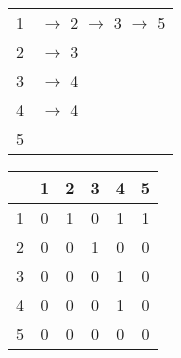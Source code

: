 \documentclass{article}
\begin{document}
    \subsection{}
        \begin{figure}[H]
            \begin{minipage}{0.8\textwidth}
                \centering
                \captionsetup{labelformat=empty}
                \caption{Listas de Adjacência}
            \end{minipage}
            \centering
            \begin{subfigure}{0.30\textwidth}
                \begin{tabular}{l | l}
                    \Large 1 & \Large $\rightarrow$ 2 $\rightarrow$ 3 $\rightarrow$ 5\\
                    \Large 2 & \Large $\rightarrow$ 3\\
                    \Large 3 & \Large $\rightarrow$ 4\\
                    \Large 4 & \Large $\rightarrow$ 4\\
                    \Large 5 & \\
                \end{tabular}
            \end{subfigure}
        \end{figure}
        \begin{figure}[H]
            \begin{minipage}{0.8\textwidth}
                \centering
                \captionsetup{labelformat=empty}
                \caption{Matriz de Adjacência}
            \end{minipage}
            \centering
            \begin{subfigure}{0.30\textwidth}
                \begin{tabular}{c|ccccc}
                      & 1 & 2 & 3 & 4 & 5 \\
                \hline
                    1 & 0 & 1 & 0 & 1 & 1 \\
                    2 & 0 & 0 & 1 & 0 & 0 \\
                    3 & 0 & 0 & 0 & 1 & 0 \\
                    4 & 0 & 0 & 0 & 1 & 0 \\
                    5 & 0 & 0 & 0 & 0 & 0 \\
                \end{tabular}
            \end{subfigure}
        \end{figure}
\end{document}

